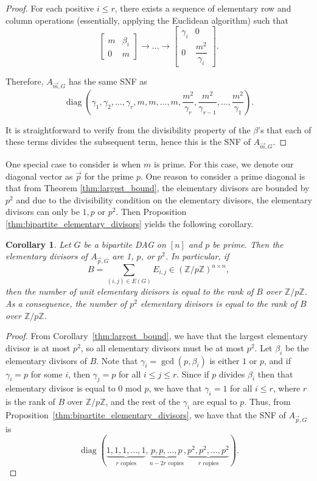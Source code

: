 \documentclass[12pt]{amsart}
\newtheorem{cor}[thm]{Corollary}
\theoremstyle{definition}
\numberwithin{equation}{section}
\newcommand{\ring}[1]{\ensuremath{\mathbb{#1}}}
\renewcommand\>{\rangle}
\newcommand\<{\langle}
\newcommand\0{\mathbf{0}}
\newcommand\ZZ{\ring{Z}}
\DeclareMathOperator{\diag}{diag}
\begin{document}
\begin{proof}
	For each positive $i \leq r$, there exists a sequence of elementary row and column operations (essentially, applying the Euclidean algorithm) such that
	\[\begin{bmatrix}
		m & \beta_i \\ 0 & m
	\end{bmatrix} \to \dots \to  \begin{bmatrix}
		\gamma_i& 0 \\ 0 & \dfrac{m^2}{\gamma_i}
	\end{bmatrix}.\]
	
	Therefore, $A_{\vec{m}, G}$ has the same SNF as 
	\[\diag\left(\gamma_1, \gamma_2, \dots, \gamma_r, m, m, \dots, m, \dfrac{m^2}{\gamma_r}, \dfrac{m^2}{\gamma_{r-1}}, \dots, \dfrac{m^2}{\gamma_{1}}\right).\]
	
	It is straightforward to verify from the divisibility property of the $\beta$'s that each of these terms divides the subsequent term, hence this is the SNF of $A_{\vec{m}, G}$.	
\end{proof}

One special case to consider is when $m$ is prime.
For this case, we denote our diagonal vector as $\vec{p}$ for the prime $p$. 
One reason to consider a prime diagonal is that from Theorem \ref{thm:largest_bound}, the elementary divisors are bounded by $p^2$ and due to the divisibility condition on the elementary divisors, the elementary divisors can only be $1, p$ or $p^2$. 
Then Proposition \ref{thm:bipartite_elementary_divisors} yields the following corollary.

\begin{cor}
	Let $G$ be a bipartite DAG on $[n]$ and $p$ be prime. 
	Then the elementary divisors of $A_{\vec{p}, G}$ are 1, $p$, or $p^2$. 
	In particular, if
	\[B = \sum_{(i,j) \in E(G)} E_{i,j} \in (\ZZ/p\ZZ)^{n \times n},\] 
	then the number of unit elementary divisors is equal to the rank of $B$ over $\ZZ/p\ZZ$. 
	As a consequence, the number of $p^2$ elementary divisors is equal to the rank of $B$ over $\ZZ/p\ZZ$.
\end{cor}
\begin{proof}
	From Corollary~\ref{thm:largest_bound}, we have that the largest elementary divisor is at most $p^2$, so all elementary divisors must be at most $p^2$. 
	Let $\beta_i$ be the elementary divisors of $B$. 
	Note that $\gamma_i = \gcd(p, \beta_i)$ is either $1$ or $p$, and if $\gamma_i = p$ for some $i$, then $\gamma_j = p$ for all $i\leq j \leq r$. 
	Since if $p$ divides $\beta_i$ then that elementary divisor is equal to $0$ mod $p$, we have that $\gamma_i = 1$ for all $i \leq r$, where $r$ is the rank of $B$ over $\ZZ/p\ZZ$, and the rest of the $\gamma_i$ are equal to $p$.
	Thus, from Proposition~\ref{thm:bipartite_elementary_divisors}, we have that the SNF of $A_{\vec{p}, G}$ is
	\[\diag(\underbrace{1,1,1,\dots,1}_{r \text{ copies}}, \underbrace{p,p,\dots,p}_{n-2r \text{ copies}},\underbrace{p^2,p^2,\dots,p^2}_{r \text{ copies}}).\]
\end{proof}
\end{document}

